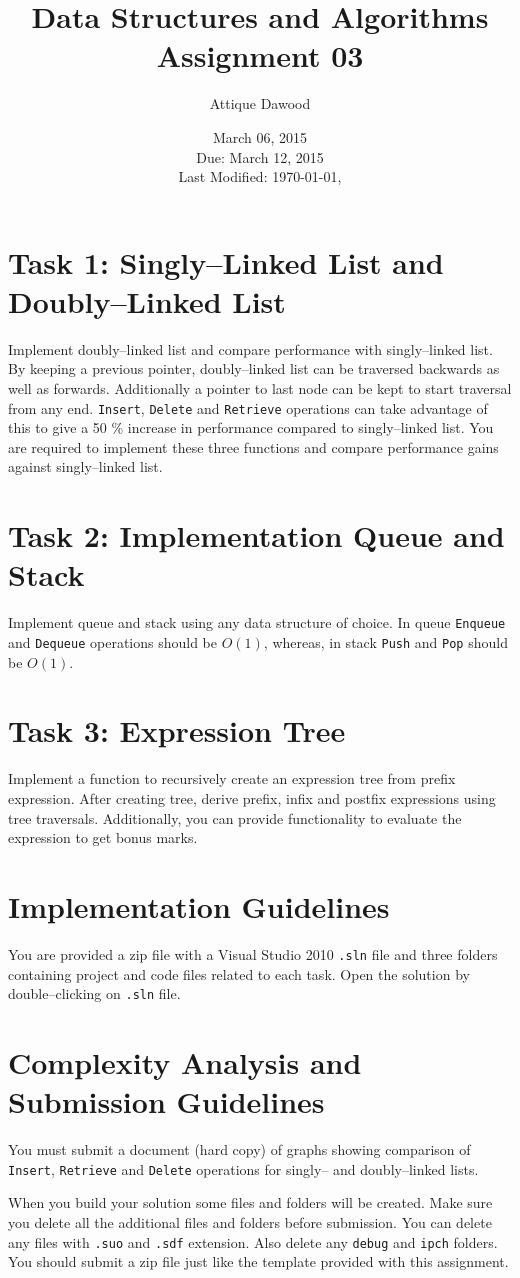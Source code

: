 \documentclass[12pt,a4paper]{article}
\title{Data Structures and Algorithms\\Assignment 03}
\author{Attique Dawood}
\date{March 06, 2015\\Due: March 12, 2015\\[0.2cm] Last Modified: \today, \currenttime}
\begin{document}
\maketitle
\section{Task 1: Singly--Linked List and Doubly--Linked List}
Implement doubly--linked list and compare performance with singly--linked list. By keeping a previous pointer, doubly--linked list can be traversed backwards as well as forwards. Additionally a pointer to last node can be kept to start traversal from any end. \verb|Insert|, \verb|Delete| and \verb|Retrieve| operations can take advantage of this to give a 50 \% increase in performance compared to singly--linked list. You are required to implement these three functions and compare performance gains against singly--linked list.
\section{Task 2: Implementation Queue and Stack}
Implement queue and stack using any data structure of choice. In queue \verb|Enqueue| and \verb|Dequeue| operations should be $O(1)$, whereas, in stack \verb|Push| and \verb|Pop| should be $O(1)$.
\section{Task 3: Expression Tree}
Implement a function to recursively create an expression tree from prefix expression. After creating tree, derive prefix, infix and postfix expressions using tree traversals. Additionally, you can provide functionality to evaluate the expression to get bonus marks.
\section{Implementation Guidelines}
You are provided a zip file with a Visual Studio 2010 \verb|.sln| file and three folders containing project and code files related to each task. Open the solution by double--clicking on \verb|.sln| file. 
\section{Complexity Analysis and Submission Guidelines}
You must submit a document (hard copy) of graphs showing comparison of \verb|Insert|, \verb|Retrieve| and \verb|Delete| operations for singly-- and doubly--linked lists.

When you build your solution some files and folders will be created. Make sure you delete all the additional files and folders before submission. You can delete any files with \verb|.suo| and \verb|.sdf| extension. Also delete any \verb|debug| and \verb|ipch| folders. You should submit a zip file just like the template provided with this assignment.
\end{document}
